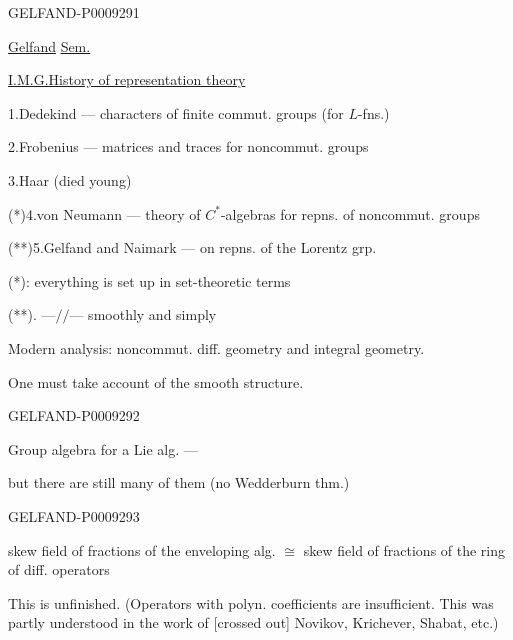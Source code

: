 \begin{GelfandAdjacentEvidence}{GELFAND-P000929}{1}

\qquad \underline{Gelfand} \underline{Sem.}

\underline{I.M.G.}\qquad \underline{History of representation theory}

1.\enspace Dedekind --- characters of finite commut. groups (for $L$-fns.)

2.\enspace Frobenius --- matrices and traces for noncommut. groups

3.\enspace Haar (died young)

(*)4.\enspace von Neumann --- theory of $C^*$-algebras for repns. of noncommut. groups

(**)5.\enspace Gelfand and Naimark --- on repns. of the Lorentz grp.

 (*): everything is set up in set-theoretic terms

\hspace{2em}(**). ---\(//\)--- smoothly and simply

Modern analysis: noncommut. diff. geometry and integral geometry.

{\small One must take account of the smooth structure.}
\end{GelfandAdjacentEvidence}
\begin{GelfandAdjacentEvidence}{GELFAND-P000929}{2}


Group algebra for a Lie alg. --- 

but there are still many of them (no Wedderburn thm.)
\end{GelfandAdjacentEvidence}
\begin{GelfandAdjacentEvidence}{GELFAND-P000929}{3}


\enspace skew field of fractions of the enveloping alg. \(\cong\) skew field of fractions of the ring of diff. operators

This is unfinished. (Operators with polyn. coefficients are insufficient. This was partly understood in the work of [crossed out] Novikov, Krichever, Shabat, etc.)
\end{GelfandAdjacentEvidence}
